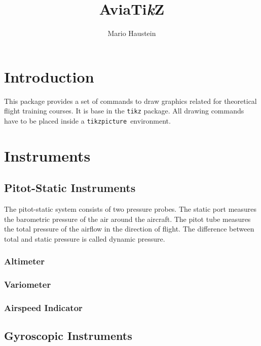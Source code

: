 \documentclass[11pt,a4paper]{article}
\title{AviaTi\textit{k}Z}
\author{Mario Haustein}
\begin{document}
\maketitle
\tableofcontents

\section{Introduction}

This package provides a set of commands to draw graphics related for
theoretical flight training courses. It is base in the \texttt{tikz} package.
All drawing commands have to be placed inside a
\texttt{tikzpicture}~environment.

\section{Instruments}


\clearpage
\subsection{Pitot-Static Instruments}

The pitot-static system consists of two pressure probes. The static port
measures the barometric pressure of the air around the aircraft. The pitot tube
measures the total pressure of the airflow in the direction of flight. The
difference between total and static pressure is called dynamic pressure.

\subsubsection{Altimeter}


\subsubsection{Variometer}


\subsubsection{Airspeed Indicator}


\clearpage
\subsection{Gyroscopic Instruments}
\end{document}
